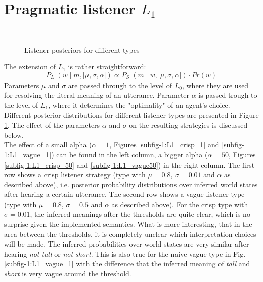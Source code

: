\section{Pragmatic listener $L_1$}
\begin{figure}[h]
 	\centering
 	\subfloat[L1-type: $\mu=0.8,\, \sigma=0.01,\, \alpha=1$\label{subfig-1:L1_crisp_1}]{
 	\texttt{[image: L1\_crisp\_alpha=1.pdf]}
 	} 	
 	\subfloat[L1-type:$\mu=0.8,\, \sigma=0.01,\, \alpha=50$\label{subfig-1:L1_crisp_50}]{
 	\texttt{[image: L1\_crisp\_alpha=50.pdf]}
 	}
 	\\
 	\subfloat[L1-type:$\mu=0.8,\, \sigma=0.5,\, \alpha=1$\label{subfig-1:L1_vague_1}]{
    \texttt{[image: L1\_opt\_alpha=1.pdf]}
 	}
 	\subfloat[L1-type:$\mu=0.8,\, \sigma=0.5,\, \alpha=50$\label{subfig-1:L1_vague50}]{
    \texttt{[image: L1\_opt\_alpha=50.pdf]}
 	}
 \caption{Listener posteriors for different types}
 \label{figure:L1-posterior}
\end{figure}
The extension of $L_1$ is rather straightforward:
\begin{equation}
P_{L_1}(w \mid m, \big[ \mu, \sigma, \alpha\big]) \propto P_{S_1}(m \mid w, \big[ \mu, \sigma, \alpha\big]) \cdot Pr(w)
\end{equation}
Parameters $\mu$ and $\sigma$ are passed through to the level of $L_0$, where they are used for resolving the literal meaning of an utterance. Parameter $\alpha$ is passed trough to the level of $L_1$, where it determines the "optimality" of an agent's choice. Different posterior distributions for different listener types are presented in Figure \ref{figure:L1-posterior}. The effect of the parameters $\alpha$ and $\sigma$ on the resulting strategies is discussed below.\\

The effect of a small alpha ($\alpha=1$, Figures \ref{subfig-1:L1_crisp_1} and \ref{subfig-1:L1_vague_1}) can be found in the left column, a bigger alpha ($\alpha=50$, Figures \ref{subfig-1:L1_crisp_50} and \ref{subfig-1:L1_vague50}) in the right column. The first row shows a crisp listener strategy (type with $\mu=0.8$, $\sigma=0.01$ and $\alpha$ as described above), i.e. posterior probability distributions over inferred world states after hearing a certain utterance. The second row shows a vague listener type (type with $\mu=0.8$, $\sigma=0.5$ and $\alpha$ as described above). For the crisp type with $\sigma = 0.01$, the inferred meanings after the thresholds are quite clear, which is no surprise given the implemented semantics. What is more interesting, that in the area between the thresholds, it is completely unclear which interpretation choices will be made. The inferred probabilities over world states are very similar after hearing \textit{not-tall} or \textit{not-short}. This is also true for the naive vague type in Fig.\ref{subfig-1:L1_vague_1} with the difference that the inferred meaning of \textit{tall} and \textit{short} is very vague around the threshold.\\

